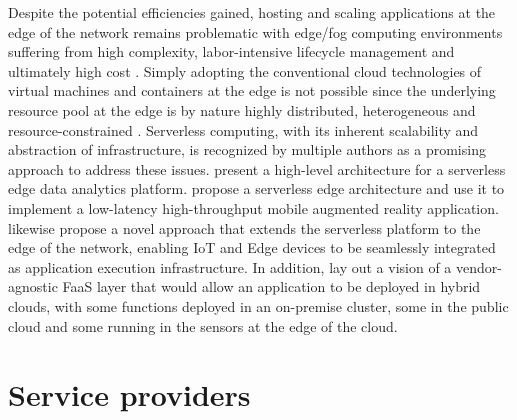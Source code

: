 Despite the potential efficiencies gained, hosting and scaling applications at the edge of the network remains problematic with edge/fog computing environments suffering from high complexity, labor-intensive lifecycle management and ultimately high cost \parencite{glikson17devicelessedge}. Simply adopting the conventional cloud technologies of virtual machines and containers at the edge is not possible since the underlying resource pool at the edge is by nature highly distributed, heterogeneous and resource-constrained \parencite{baresi17edgecomputing}. Serverless computing, with its inherent scalability and abstraction of infrastructure, is recognized by multiple authors as a promising approach to address these issues. \textcite{nastic17analyticsedge} present a high-level architecture for a serverless edge data analytics platform. \textcite{baresi17edgecomputing} propose a serverless edge architecture and use it to implement a low-latency high-throughput mobile augmented reality application. \textcite{glikson17devicelessedge} likewise propose a novel approach that extends the serverless platform to the edge of the network, enabling IoT and Edge devices to be seamlessly integrated as application execution infrastructure. In addition, \textcite{van2017spec} lay out a vision of a vendor-agnostic FaaS layer that would allow an application to be deployed in hybrid clouds, with some functions deployed in an on-premise cluster, some in the public cloud and some running in the sensors at the edge of the cloud.

\section{Service providers} \label{sec:providers}

